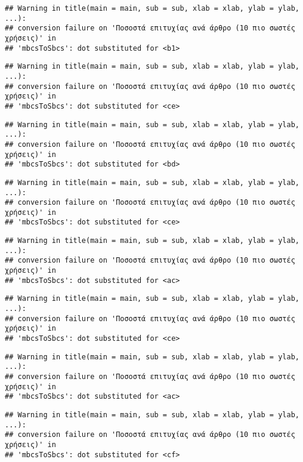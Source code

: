 \documentclass[
]{article}
\begin{document}
\begin{verbatim}
## Warning in title(main = main, sub = sub, xlab = xlab, ylab = ylab, ...):
## conversion failure on 'Ποσοστά επιτυχίας ανά άρθρο (10 πιο σωστές χρήσεις)' in
## 'mbcsToSbcs': dot substituted for <b1>
\end{verbatim}

\begin{verbatim}
## Warning in title(main = main, sub = sub, xlab = xlab, ylab = ylab, ...):
## conversion failure on 'Ποσοστά επιτυχίας ανά άρθρο (10 πιο σωστές χρήσεις)' in
## 'mbcsToSbcs': dot substituted for <ce>
\end{verbatim}

\begin{verbatim}
## Warning in title(main = main, sub = sub, xlab = xlab, ylab = ylab, ...):
## conversion failure on 'Ποσοστά επιτυχίας ανά άρθρο (10 πιο σωστές χρήσεις)' in
## 'mbcsToSbcs': dot substituted for <bd>
\end{verbatim}

\begin{verbatim}
## Warning in title(main = main, sub = sub, xlab = xlab, ylab = ylab, ...):
## conversion failure on 'Ποσοστά επιτυχίας ανά άρθρο (10 πιο σωστές χρήσεις)' in
## 'mbcsToSbcs': dot substituted for <ce>
\end{verbatim}

\begin{verbatim}
## Warning in title(main = main, sub = sub, xlab = xlab, ylab = ylab, ...):
## conversion failure on 'Ποσοστά επιτυχίας ανά άρθρο (10 πιο σωστές χρήσεις)' in
## 'mbcsToSbcs': dot substituted for <ac>
\end{verbatim}

\begin{verbatim}
## Warning in title(main = main, sub = sub, xlab = xlab, ylab = ylab, ...):
## conversion failure on 'Ποσοστά επιτυχίας ανά άρθρο (10 πιο σωστές χρήσεις)' in
## 'mbcsToSbcs': dot substituted for <ce>
\end{verbatim}

\begin{verbatim}
## Warning in title(main = main, sub = sub, xlab = xlab, ylab = ylab, ...):
## conversion failure on 'Ποσοστά επιτυχίας ανά άρθρο (10 πιο σωστές χρήσεις)' in
## 'mbcsToSbcs': dot substituted for <ac>
\end{verbatim}

\begin{verbatim}
## Warning in title(main = main, sub = sub, xlab = xlab, ylab = ylab, ...):
## conversion failure on 'Ποσοστά επιτυχίας ανά άρθρο (10 πιο σωστές χρήσεις)' in
## 'mbcsToSbcs': dot substituted for <cf>
\end{verbatim}
\end{document}
